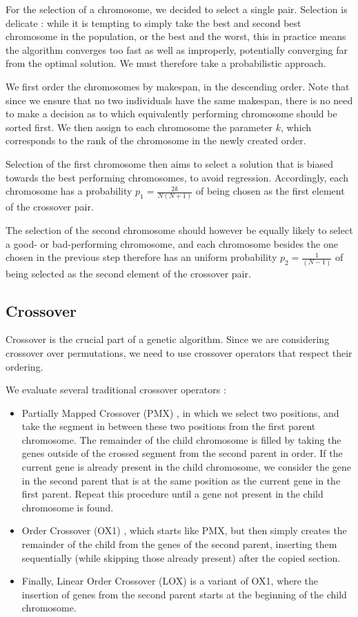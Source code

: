 \documentclass{mimosis}
\begin{document}
For the selection of a chromosome, we decided to select a single pair. Selection is delicate : while it is tempting to simply take the best and second best chromosome in the population, or the best and the worst, this in practice means the algorithm converges too fast as well as improperly, potentially converging far from the optimal solution. We must therefore take a probabilistic approach.

We first order the chromosomes by makespan, in the descending order. Note that since we ensure that no two individuals have the same makespan, there is no need to make a decision as to which equivalently performing chromosome should be sorted first. We then assign to each chromosome the parameter \(k\), which corresponds to the rank of the chromosome in the newly created order.

Selection of the first chromosome then aims to select a solution that is biased towards the best performing chromosomes, to avoid regression. Accordingly, each chromosome has a probability \(p_{1} = \frac{2k}{N(N+1)}\) of being chosen as the first element of the crossover pair.

The selection of the second chromosome should however be equally likely to select a good- or bad-performing chromosome, and each chromosome besides the one chosen in the previous step therefore has an uniform probability \(p_{2} = \frac{1}{(N-1)}\) of being selected as the second element of the crossover pair.

\subsection{Crossover} \label{crossover}
Crossover is the crucial part of a genetic algorithm. Since we are considering crossover over permutations, we need to use crossover operators that respect their ordering.

We evaluate several traditional crossover operators : 
\begin{itemize}
\item Partially Mapped Crossover (PMX) \citep{goldberg1985alleles}, in which we select two positions, and take the segment in between these two positions from the first parent chromosome. The remainder of the child chromosome is filled by taking the genes outside of the crossed segment from the second parent in order. If the current gene is already present in the child chromosome, we consider the gene in the second parent that is at the same position as the current gene in the first parent. Repeat this procedure until a gene not present in the child chromosome is found. 
\item Order Crossover (OX1) \citep{davis1985applying}, which starts like PMX, but then simply creates the remainder of the child from the genes of the second parent, inserting them sequentially (while skipping those already present) after the copied section.
\item Finally, Linear Order Crossover (LOX) \citep{oliver1987study} is a variant of OX1, where the insertion of genes from the second parent starts at the beginning of the child chromosome.
\end{itemize}
\end{document}
